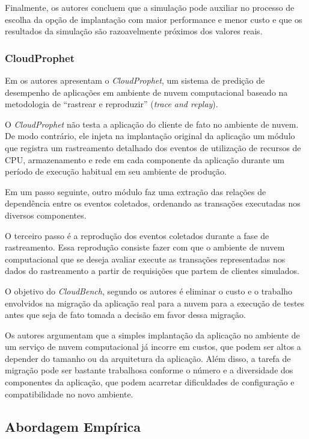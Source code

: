 Finalmente, os autores concluem que a simulação pode auxiliar no processo de escolha da opção de implantação com maior performance e menor custo e que os resultados da simulação são razoavelmente próximos dos valores reais.

\subsubsection{CloudProphet}\label{subsec:CloudProphet}
Em \cite{li2011cloudprophet} os autores apresentam o \textit{CloudProphet}, um sistema de
predição de desempenho de aplicações em ambiente de nuvem computacional baseado 
na metodologia de ``rastrear e reproduzir'' (\textit{trace and replay}).

O \textit{CloudProphet} não testa a aplicação do cliente de fato no ambiente de nuvem. De
modo contrário, ele injeta na implantação original da aplicação um módulo que 
registra um rastreamento detalhado dos eventos de utilização de recursos de CPU,
armazenamento e rede em cada componente da aplicação durante um período de 
execução habitual em seu ambiente de produção.

Em um passo seguinte, outro módulo faz uma extração das relações de dependência 
entre os eventos coletados, ordenando as transações executadas nos diversos 
componentes.

O terceiro passo é a reprodução dos eventos coletados durante a fase de 
rastreamento. Essa reprodução consiste fazer com que o ambiente de nuvem 
computacional que se deseja avaliar execute as transações representadas nos dados
do rastreamento a partir de requisições que partem de clientes simulados.
   
O objetivo do \textit{CloudBench}, segundo os autores é eliminar o custo e o trabalho 
envolvidos na migração da aplicação real para a nuvem para a execução de testes 
antes que seja de fato tomada a decisão em favor dessa migração.

Os autores argumentam que a simples implantação da aplicação no ambiente de um
serviço de nuvem computacional já incorre em custos, que podem ser altos a 
depender do tamanho ou da arquitetura da aplicação. Além disso, a tarefa de
migração pode ser bastante trabalhosa conforme o número e a diversidade dos 
componentes da aplicação, que podem acarretar dificuldades de configuração e
compatibilidade no novo ambiente.

\subsection{Abordagem Empírica}

